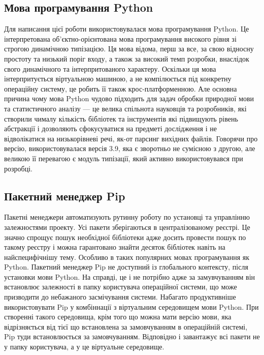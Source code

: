 \subsection{Мова програмування Python}
Для написання цієї роботи використовувалася мова програмування Python. Це інтерпретована
об'єктно-орієнтована мова програмування високого рівня зі строгою динамічною типізацією.
Ця мова відома, перш за все, за свою відносну простоту та низький поріг входу,
а також за високий темп розробки, внаслідок свого динамічного та інтерпритованого характеру.
Оскільки ця мова інтерпритується віртуальною машиною, а не компілюється під конкретну
операційну систему, це робить її також крос-платформенною.
Але основна причина чому мова Python чудово підходить для задач обробки природної мови
та статистичного аналізу --- це велика спільнота науковців та розробників, які створили чималу
кількість бібліотек та інструментів які підвищують рівень абстракції і дозволяють сфокусуватися
на предметі дослідження і не відволікатися на низькорівневі речі, як-от
парсинг вихідних файлів.
Говорячи про версію, використовувалася версія 3.9, яка є зворотньо не
сумісною з другою, але великою її перевагою є модуль типізації, який
активно використовувався при розробці.

\subsection{Пакетний менеджер Pip}
Пакетні менеджери автоматизують рутинну роботу по установці та управлінню
залежностями проекту. Усі пакети зберігаються в централізованому
реєстрі. Це значно спрощує пошук необхідної бібліотеки адже досить провести
пошук по такому реєстру і можна гарантовано знайти десяток бібліотек навіть
на найспецифічнішу тему. Особливо в таких популярних мовах програмування як
Python. Пакетний менеджер Pip не доступний із глобального контексту, після
установки мови Python. На справді, це і не потрібно адже за замувчуванням
він встановлює залежності в папку користувача операційної системи, що може
призводити до небажаного засмічування системи. Набагато продуктивніше
використовувати Pip у комбіннації з віртуальним середовищем мови Python.
При створенні такого середовища, крім того що можна мати версію мови, яка
відрізняється від тієї що встановлена за замовчуванням в операційній системі,
Pip туди встановлюється за замовчуванням. Відповідно і завантажує
всі пакети не у папку користувача, а у це віртуальне середовище.

